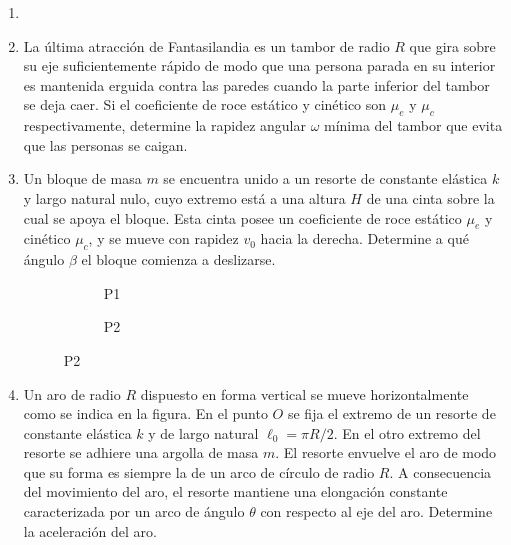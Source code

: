 \documentclass[letterpaper,11pt]{article}
\begin{document}
\vspace{-1cm}
\begin{enumerate}\setlength{\itemsep}{0.4cm}


\item[]

\item La última atracción de Fantasilandia es un tambor de radio $R$ que gira sobre su eje suficientemente rápido de modo que una persona parada en su interior es mantenida erguida contra las paredes cuando la parte inferior del tambor se deja caer. Si el coeficiente de roce estático y cinético son $\mu_e$ y $\mu_c$ respectivamente, determine la rapidez angular $\omega$ mínima del tambor que evita que las personas se caigan.

\item Un bloque de masa $m$ se encuentra unido a un resorte de constante elástica $k$ y largo natural nulo, cuyo extremo está a una altura $H$ de una cinta sobre la cual se apoya el bloque. Esta cinta posee un coeficiente de roce estático $\mu_e$ y cinético $\mu_c$, y se mueve con rapidez $v_0$ hacia la derecha. Determine a qué ángulo $\beta$ el bloque comienza a deslizarse. 

\begin{figure}[H]
    \centering
    \begin{subfigure}[t]{0.45\textwidth}
        \centering
        
        \caption{P1}
    \end{subfigure}
    \begin{subfigure}[t]{0.45\textwidth}
        \centering
         
        \caption{P2}
    \end{subfigure}
\end{figure}

\item Un aro de radio $R$ dispuesto en forma vertical se mueve horizontalmente como se indica en la figura. En el punto $O$ se fija el extremo de un resorte de constante elástica $k$ y de largo natural $\ell_0 = \pi R /2$. En el otro extremo del resorte se adhiere una argolla de masa $m$. El resorte envuelve el aro de modo que su forma es siempre la de un arco de círculo de radio $R$. A consecuencia del movimiento del aro, el resorte mantiene una elongación constante caracterizada por un arco de ángulo $\theta$ con respecto al eje del aro. Determine la aceleración del aro.


\end{enumerate}
\end{document}
